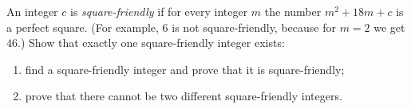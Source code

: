 An integer $c$ is \emph{square-friendly} if for every integer $m$ the number $m^2+18m+c$ is a perfect square. (For example, $6$ is not square-friendly, because for $m=2$ we get $46$.) Show that exactly one square-friendly integer exists:
\begin{enumerate}
\item[(a)] find a square-friendly integer and prove that it is square-friendly;
\item[(b)] prove that there cannot be two different square-friendly integers.
\end{enumerate}

